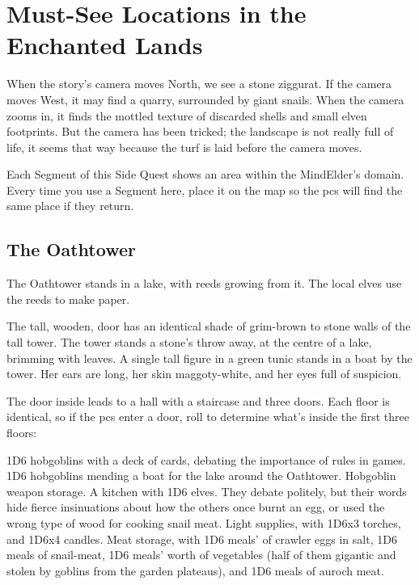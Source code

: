 \section{Must-See Locations in the Enchanted Lands}

When the story's camera moves North, we see a stone ziggurat.
If the camera moves West, it may find a quarry, surrounded by giant snails.
When the camera zooms in, it finds the mottled texture of discarded shells and small elven footprints.
But the camera has been tricked; the landscape is not really full of life, it seems that way because the turf is laid before the camera moves.

Each Segment of this Side Quest shows an area within the MindElder's domain.
Every time you use a Segment here, place it on the map so the \glspl{pc} will find the same place if they return.

\subsection{The Oathtower}

The Oathtower stands in a lake, with reeds growing from it.
The local elves use the reeds to make paper.

\begin{boxtext}
  The tall, wooden, door has an identical shade of grim-brown to stone walls of the tall tower.
  The tower stands a stone's throw away, at the centre of a lake, brimming with leaves.
  A single tall figure in a green tunic stands in a boat by the tower.
  Her ears are long, her skin maggoty-white, and her eyes full of suspicion.
\end{boxtext}

The door inside leads to a hall with a staircase and three doors.
Each floor is identical, so if the \glspl{pc} enter a door, roll to determine what's inside the first three floors:

\begin{dlist}
  1D6 hobgoblins with a deck of cards, debating the importance of rules in games.
  1D6 hobgoblins mending a boat for the lake around the Oathtower.
  Hobgoblin weapon storage.
  A kitchen with 1D6 elves.  They debate politely, but their words hide fierce insinuations about how the others once burnt an egg, or used the wrong type of wood for cooking snail meat.
  Light supplies, with 1D6x3 torches, and 1D6x4 candles.
  Meat storage, with 1D6 meals' of \gls{crawler} eggs in salt, 1D6 meals of snail-meat, 1D6 meals' worth of vegetables (half of them gigantic and stolen by goblins from the garden plateaus), and 1D6 meals of auroch meat.
\end{dlist}

